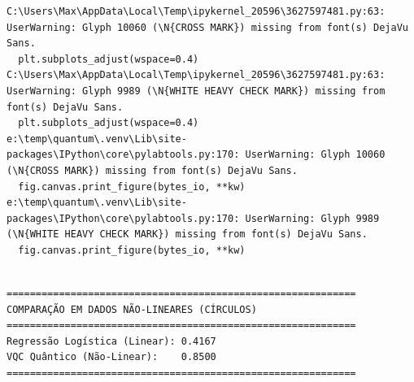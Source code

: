 \documentclass[
  brazilian,
]{report}
\begin{document}
\begin{verbatim}
C:\Users\Max\AppData\Local\Temp\ipykernel_20596\3627597481.py:63: UserWarning: Glyph 10060 (\N{CROSS MARK}) missing from font(s) DejaVu Sans.
  plt.subplots_adjust(wspace=0.4)
C:\Users\Max\AppData\Local\Temp\ipykernel_20596\3627597481.py:63: UserWarning: Glyph 9989 (\N{WHITE HEAVY CHECK MARK}) missing from font(s) DejaVu Sans.
  plt.subplots_adjust(wspace=0.4)
e:\temp\quantum\.venv\Lib\site-packages\IPython\core\pylabtools.py:170: UserWarning: Glyph 10060 (\N{CROSS MARK}) missing from font(s) DejaVu Sans.
  fig.canvas.print_figure(bytes_io, **kw)
e:\temp\quantum\.venv\Lib\site-packages\IPython\core\pylabtools.py:170: UserWarning: Glyph 9989 (\N{WHITE HEAVY CHECK MARK}) missing from font(s) DejaVu Sans.
  fig.canvas.print_figure(bytes_io, **kw)
\end{verbatim}

\begin{verbatim}

============================================================
COMPARAÇÃO EM DADOS NÃO-LINEARES (CÍRCULOS)
============================================================
Regressão Logística (Linear): 0.4167
VQC Quântico (Não-Linear):    0.8500
============================================================
\end{verbatim}
\end{document}
